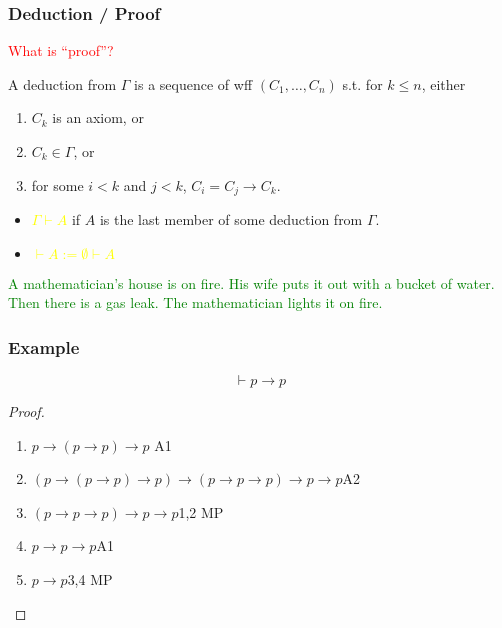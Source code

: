 \documentclass[UTF8,aspectratio=43,11pt,colorlinks,compress,openany]{beamer}%
\begin{document}
\begin{frame}\frametitle{Deduction / Proof}
	\begin{center}
	\end{center}
		\begin{block}{}
			\centering\textcolor{red}{What is ``proof''?}
		\end{block}
		\begin{definition}[Deduction]
			A deduction from $\Gamma$ is a sequence of wff $(C_1,\dots, C_n)$ s.t. for $k\leq n$, either
			\begin{enumerate}
				\item $C_k$ is an axiom, or\\
				\item $C_k\in\Gamma$, or\\
				\item for some $i<k$ and $j<k$, $C_i=C_j\to C_k$.
			\end{enumerate}
		\end{definition}
		\begin{itemize}
			\item \textcolor{yellow}{$\Gamma\vdash A$} if $A$ is the last member of some deduction from $\Gamma$.
			\item \textcolor{yellow}{$\vdash A:=\emptyset\vdash A$}
		\end{itemize}
\textcolor{green}{A mathematician's house is on fire. His wife puts it out with a bucket of water. Then there is a gas leak. The mathematician lights it on fire.}
\end{frame}

\begin{frame}\frametitle{Example}
	\begin{theorem}
		\[\vdash p\to p\]
	\end{theorem}
	\begin{proof}
		\begin{enumerate}
			\item $p\to(p\to p)\to p$ \hfill A1
			\item $(p\to(p\to p)\to p)\to(p\to p\to p)\to p\to p$\hfill A2
			\item $(p\to p\to p)\to p\to p$\hfill 1,2 MP
			\item $p\to p\to p$\hfill A1
			\item $p\to p$\hfill 3,4 MP
		\end{enumerate}
	\end{proof}
\end{frame}
\end{document}
